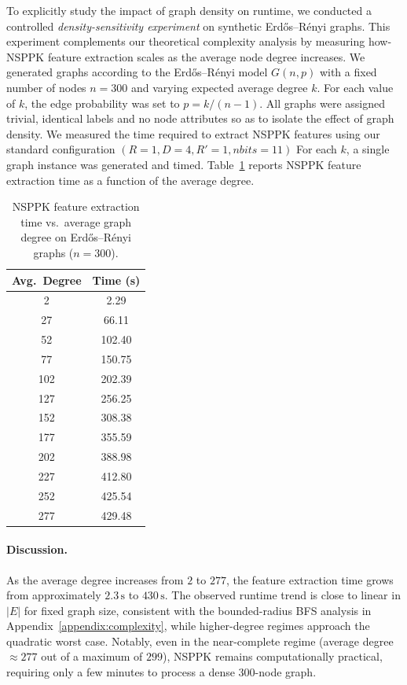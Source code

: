 To explicitly study the impact of graph density on runtime, we conducted a
controlled \emph{density-sensitivity experiment} on synthetic Erdős--Rényi
graphs. This experiment complements our theoretical complexity analysis by
measuring how-
NSPPK feature extraction scales as the average node degree
increases.
We generated graphs according to the Erdős--Rényi model $G(n,p)$ with a fixed
number of nodes $n = 300$ and varying expected average degree $k$.
For each value of $k$, the edge probability was set to
$p = k/(n-1)$.
All graphs were assigned trivial, identical labels and no node attributes so as
to isolate the effect of graph density.
We measured the  time required to extract NSPPK features using our
standard configuration $(R=1, D=4, R'=1, nbits=11)$
For each $k$, a single graph instance was generated and timed.
Table~\ref{tab:density_sensitivity} reports NSPPK feature extraction time as a
function of the average degree.
\begin{table}[h]
\centering
\caption{NSPPK feature extraction time vs.\ average graph degree on
Erdős--Rényi graphs ($n=300$).}
\label{tab:density_sensitivity}
\scriptsize
\setlength{\tabcolsep}{6pt}
\begin{tabular}{cc}
\toprule
\textbf{Avg.\ Degree} & \textbf{Time (s)} \\
\midrule
2   & 2.29   \\
27  & 66.11  \\
52  & 102.40 \\
77  & 150.75 \\
102 & 202.39 \\
127 & 256.25 \\
152 & 308.38 \\
177 & 355.59 \\
202 & 388.98 \\
227 & 412.80 \\
252 & 425.54 \\
277 & 429.48 \\
\bottomrule
\end{tabular}
\end{table}
\paragraph{Discussion.}
As the average degree increases from $2$ to $277$, the feature extraction time
grows  from approximately $2.3\,\mathrm{s}$ to $430\,\mathrm{s}$.
The observed runtime trend is close to linear in $|E|$ for fixed graph size, consistent with the bounded-radius BFS analysis in Appendix~\ref{appendix:complexity}, while higher-degree regimes approach the quadratic worst case.
Notably, even in the near-complete regime (average degree $\approx 277$ out of a
maximum of $299$), NSPPK remains computationally practical, requiring only a few
minutes to process a dense $300$-node graph.

